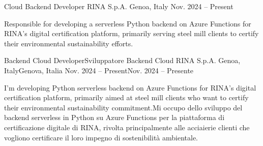


\begin{cventries}


\ifenglish
\cventry
{Cloud Backend Developer} %
{RINA S.p.A.} %
{Genoa, Italy} %
{Nov. 2024 -- Present} %
{ %
\begin{cvitems}
  \item {Responsible for developing a serverless Python backend on Azure Functions for RINA's digital certification platform, primarily serving steel mill clients to certify their environmental sustainability efforts.}
\end{cvitems}
}
\else
\cventry
{\ifenglish Backend Cloud Developer\else Sviluppatore Backend Cloud\fi} %
{RINA S.p.A.} %
{\ifenglish Genoa, Italy\else Genova, Italia\fi} %
{\ifenglish Nov. 2024 -- Present\else Nov. 2024 -- Presente\fi} %
{ %
\begin{cvitems}
  \item {\ifenglish I'm developing Python serverless backend on Azure Functions for RINA's digital certification platform, primarily aimed at steel mill clients who want to certify their environmental sustainability commitment.\else Mi occupo dello sviluppo del backend serverless in Python su Azure Functions per la piattaforma di certificazione digitale di RINA, rivolta principalmente alle acciaierie clienti che vogliono certificare il loro impegno di sostenibilità ambientale.\fi}
\end{cvitems}
}
\fi



\end{cventries}
